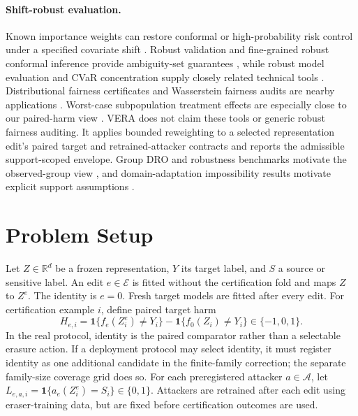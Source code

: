 \paragraph{Shift-robust evaluation.}
Known importance weights can restore conformal or high-probability risk control
under a specified covariate shift
\cite{tibshirani2019covariate,almeida2025hprc,zecchin2025wcrc}. Robust validation and
fine-grained robust conformal inference provide ambiguity-set guarantees
\cite{cauchois2024robust,ai2024finegrained}, while robust model evaluation and
CVaR concentration supply closely related technical tools
\cite{najafi2025federated,thomas2019cvar,waudbysmith2024means}. Distributional
fairness certificates and Wasserstein fairness audits are nearby applications
\cite{kang2022certifying,ehyaei2025fragile}. Worst-case subpopulation
treatment effects are especially close to our paired-harm view
\cite{jeong2020worstcase}. VERA does not claim these tools or generic robust
fairness auditing. It applies bounded reweighting to a selected representation
edit's paired target and retrained-attacker contracts and reports the admissible
support-scoped envelope. Group DRO and robustness benchmarks motivate the observed-group view
\cite{sagawa2020groupdro,koh2021wilds,sohoni2020subclass}, and
domain-adaptation impossibility results motivate explicit support assumptions
\cite{bendavid2010impossibility,subbaswamy2021evaluation}.

\section{Problem Setup}

Let $Z\in\mathbb{R}^d$ be a frozen representation, $Y$ its target label, and
$S$ a source or sensitive label. An edit $e\in\mathcal E$ is fitted without the
certification fold and maps $Z$ to $Z^e$. The identity is $e=0$. Fresh target
models are fitted after every edit. For certification example $i$, define
paired target harm
\begin{equation}
H_{e,i}=\mathbf 1\{f_e(Z_i^e)\ne Y_i\}-
\mathbf 1\{f_0(Z_i)\ne Y_i\}\in\{-1,0,1\}.
\end{equation}
In the real protocol, identity is the paired comparator rather than a selectable
erasure action. If a deployment protocol may select identity, it must register
identity as one additional candidate in the finite-family correction; the
separate family-size coverage grid does so.
For each preregistered attacker $a\in\mathcal A$, let
$L_{e,a,i}=\mathbf 1\{a_e(Z_i^e)=S_i\}\in\{0,1\}$. Attackers are retrained
after each edit using eraser-training data, but are fixed before certification
outcomes are used.

